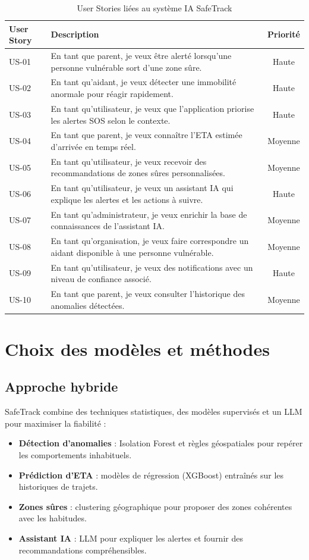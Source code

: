 \begin{table}[H]
\centering
\begin{tabular}{|p{2cm}|p{10cm}|c|}
\hline
\textbf{User Story} & \textbf{Description} & \textbf{Priorité} \\
\hline
US-01 & En tant que parent, je veux être alerté lorsqu'une personne vulnérable sort d'une zone sûre. & Haute \\
\hline
US-02 & En tant qu'aidant, je veux détecter une immobilité anormale pour réagir rapidement. & Haute \\
\hline
US-03 & En tant qu'utilisateur, je veux que l'application priorise les alertes SOS selon le contexte. & Haute \\
\hline
US-04 & En tant que parent, je veux connaître l'ETA estimée d'arrivée en temps réel. & Moyenne \\
\hline
US-05 & En tant qu'utilisateur, je veux recevoir des recommandations de zones sûres personnalisées. & Moyenne \\
\hline
US-06 & En tant qu'utilisateur, je veux un assistant IA qui explique les alertes et les actions à suivre. & Haute \\
\hline
US-07 & En tant qu'administrateur, je veux enrichir la base de connaissances de l'assistant IA. & Moyenne \\
\hline
US-08 & En tant qu'organisation, je veux faire correspondre un aidant disponible à une personne vulnérable. & Moyenne \\
\hline
US-09 & En tant qu'utilisateur, je veux des notifications avec un niveau de confiance associé. & Haute \\
\hline
US-10 & En tant que parent, je veux consulter l'historique des anomalies détectées. & Moyenne \\
\hline
\end{tabular}
\caption{User Stories liées au système IA SafeTrack}
\end{table}

\section{Choix des modèles et méthodes}

\subsection{Approche hybride}
SafeTrack combine des techniques statistiques, des modèles supervisés et un LLM pour maximiser la fiabilité :
\begin{itemize}
    \item \textbf{Détection d'anomalies} : Isolation Forest et règles géospatiales pour repérer les comportements inhabituels.
    \item \textbf{Prédiction d'ETA} : modèles de régression (XGBoost) entraînés sur les historiques de trajets.
    \item \textbf{Zones sûres} : clustering géographique pour proposer des zones cohérentes avec les habitudes.
    \item \textbf{Assistant IA} : LLM pour expliquer les alertes et fournir des recommandations compréhensibles.
\end{itemize}

